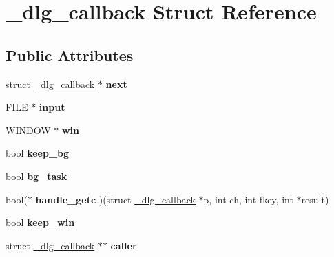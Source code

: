 \hypertarget{struct__dlg__callback}{}\section{\+\_\+dlg\+\_\+callback Struct Reference}
\label{struct__dlg__callback}
\subsection*{Public Attributes}
\begin{DoxyCompactItemize}
\item 
struct \hyperlink{struct__dlg__callback}{\+\_\+dlg\+\_\+callback} $\ast$ {\bfseries next}\hypertarget{struct__dlg__callback_a3ceac6761fa51379d63d08cb5b857c84}{}\label{struct__dlg__callback_a3ceac6761fa51379d63d08cb5b857c84}

\item 
F\+I\+LE $\ast$ {\bfseries input}\hypertarget{struct__dlg__callback_a794f012c9b296121b103f01a659110e7}{}\label{struct__dlg__callback_a794f012c9b296121b103f01a659110e7}

\item 
W\+I\+N\+D\+OW $\ast$ {\bfseries win}\hypertarget{struct__dlg__callback_a7998ede53d339209932c326245f0dda5}{}\label{struct__dlg__callback_a7998ede53d339209932c326245f0dda5}

\item 
bool {\bfseries keep\+\_\+bg}\hypertarget{struct__dlg__callback_a2ef01db8630326718b738200040399ba}{}\label{struct__dlg__callback_a2ef01db8630326718b738200040399ba}

\item 
bool {\bfseries bg\+\_\+task}\hypertarget{struct__dlg__callback_a53429416d4ff4449087fabf5d7227808}{}\label{struct__dlg__callback_a53429416d4ff4449087fabf5d7227808}

\item 
bool($\ast$ {\bfseries handle\+\_\+getc} )(struct \hyperlink{struct__dlg__callback}{\+\_\+dlg\+\_\+callback} $\ast$p, int ch, int fkey, int $\ast$result)\hypertarget{struct__dlg__callback_a6291d3d345e5935373169596d791bbe6}{}\label{struct__dlg__callback_a6291d3d345e5935373169596d791bbe6}

\item 
bool {\bfseries keep\+\_\+win}\hypertarget{struct__dlg__callback_a16068a404ec019a164a44d7a8a8fc9fe}{}\label{struct__dlg__callback_a16068a404ec019a164a44d7a8a8fc9fe}

\item 
struct \hyperlink{struct__dlg__callback}{\+\_\+dlg\+\_\+callback} $\ast$$\ast$ {\bfseries caller}\hypertarget{struct__dlg__callback_ad6bdd9c7f20ffa991a629a66180a64dd}{}\label{struct__dlg__callback_ad6bdd9c7f20ffa991a629a66180a64dd}


\end{DoxyCompactItemize}
